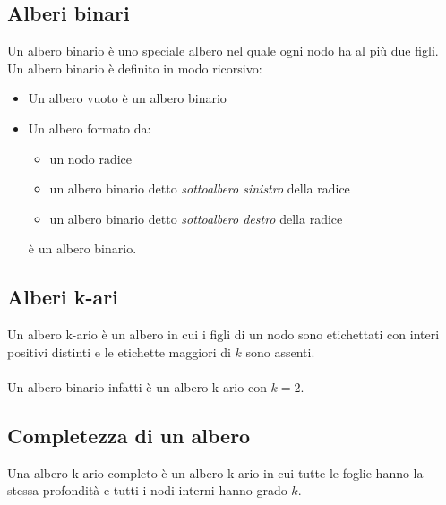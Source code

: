 \documentclass[italian]{article}
\begin{document}
\subsection{Alberi binari}
Un albero binario è uno speciale albero nel quale ogni nodo ha al più due figli. Un albero binario è definito in modo ricorsivo:
\begin{itemize}[itemsep=0pt]
	\item Un albero vuoto è un albero binario
	\item Un albero formato da:
	\begin{itemize}[itemsep=0pt]
		\item un nodo radice
		\item un albero binario detto \textit{sottoalbero sinistro} della radice
		\item un albero binario detto \textit{sottoalbero destro} della radice
	\end{itemize}
	è un albero binario. 
\end{itemize}
\subsection{Alberi k-ari}
Un albero k-ario è un albero in cui i figli di un nodo sono etichettati con interi positivi distinti e le etichette maggiori di $k$ sono assenti. \\\\
Un albero binario infatti è un albero k-ario con $k=2$.
\subsection{Completezza di un albero}
Una albero k-ario completo è un albero k-ario in cui tutte le foglie hanno la stessa profondità e tutti i nodi interni hanno grado $k$.
\end{document}
